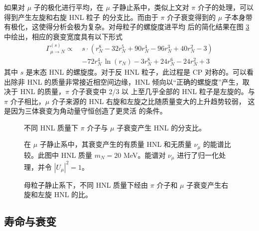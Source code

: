 \documentclass[UTF8]{ctexart}
\begin{document}
如果对 $\mu$ 子的极化进行平均，在 $\mu$ 子静止系中，类似上文对 $\pi$ 介子的处理，可以得到产生左旋和右旋 HNL 粒子
的分支比。而由于 $\pi$ 介子衰变得到的 $\mu$ 子本身带有极化，这使得分析会极为复杂。对母粒子的螺旋度进平均
后的简化结果在图 \ref{fig:spec_muon_HNL_pol} 中绘出，相应的衰变宽度具有以下形式
\begin{equation}
  \begin{split}
      \Gamma_{\mu \to N}^{(s)} \propto \; &s \cdot (r_N^8-32 r_N^5+90 r_N^4-96 r_N^3+40 r_N^2-3) \\ 
              &-72 r_N^4 \, \ln{(r_N)} -3 r_N^8+24 r_N^6-24 r_N^2+3
  \end{split}
\end{equation}
其中 $s$ 是末态 HNL 的螺旋度。对于反 HNL 粒子，此过程是 CP 对称的。可以看出除非 HNL 的质量非常接近相空间边缘，HNL 
倾向以“正确的螺旋度”产生，取决于 HNL 的质量，$\pi$ 介子衰变中 2/3 以
上至几乎全部的 HNL 粒子是左旋的。与 $\pi$ 介子相比，$\mu$ 介子来源的 HNL 右旋和左旋之比随质量变大的上升趋势较弱，
这是因为三体衰变为角动量守恒创造了更灵活
的条件。

\begin{figure}[htbp]
  \centering
  
  \vspace{-1.0cm}
  \caption{不同 HNL 质量下 $\pi$ 介子与 $\mu$ 子衰变产生 HNL 的分支比。}
  \label{fig:spec_BR_HNL}
\end{figure}

\begin{figure}[htbp]
  \centering
  
  \vspace{-1.0cm}
  \caption{在 $\mu$ 子静止系中，其衰变产生的有质量 HNL 和无质量 $\nu_\mu$ 的能谱比较。此图中 HNL 质量
  $m_N = 20$ MeV。能谱对 $\nu_\mu$ 进行了归一化处理，并令 $|U_{\mu}|^2 = 1$。}
  \label{fig:spec_muon_HNL}
\end{figure}


\begin{figure}[htbp]
  \centering
  
  \vspace{-1.0cm}
  \caption{母粒子静止系下，不同 HNL 质量下经由 $\pi$ 介子和 $\mu$ 子衰变产生右旋和左旋 HNL 的比。}
  \label{fig:spec_muon_HNL_pol}
\end{figure}

\subsection{寿命与衰变}
\end{document}
